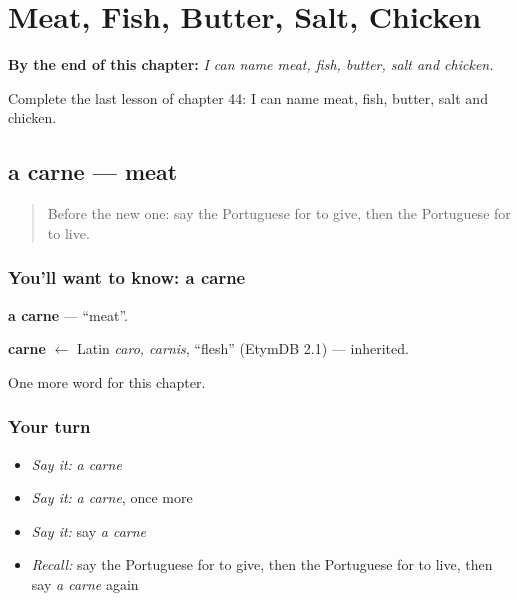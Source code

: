 
\chapter{Meat, Fish, Butter, Salt, Chicken}
\label{ch:pt-meat-fish-butter-salt-chicken}

\begin{chapteropening}
\textbf{By the end of this chapter:} \emph{I can name meat, fish, butter, salt and chicken.}

Complete the last lesson of chapter 44: I can name meat, fish, butter, salt and chicken.
\end{chapteropening}

\section[a carne]{a carne — meat}

\label{lesson:PT-C44-carne}



\begin{quote}
Before the new one: say the Portuguese for to give, then the Portuguese for to live.
\end{quote}

\subsection*{You'll want to know: a carne}
\textbf{a carne} — \textquotedblleft{}meat\textquotedblright{}.

\begin{cousinweb}
\textbf{carne} $\leftarrow$ Latin \emph{caro, carnis}, \textquotedblleft{}flesh\textquotedblright{} (EtymDB 2.1) — inherited.
\end{cousinweb}

\begin{grammarlens}[title={What you've built}]
One more word for this chapter.
\end{grammarlens}

\subsection*{Your turn}
\begin{itemize}
\raggedright
  \item \emph{Say it:} \emph{a carne}
  \item \emph{Say it:} \emph{a carne}, once more
  \item \emph{Say it:} say \emph{a carne}
  \item \emph{Recall:} say the Portuguese for to give, then the Portuguese for to live, then say \emph{a carne} again
\end{itemize}

